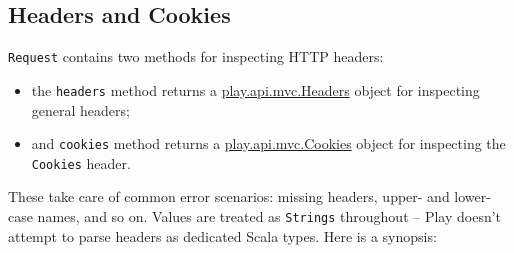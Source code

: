 \documentclass[oneside,11pt,a4paper,]{book}
\newenvironment{Shaded}{\begin{snugshade}}{\end{snugshade}}
\newcommand{\KeywordTok}[1]{\textcolor[rgb]{0.13,0.29,0.53}{\textbf{{#1}}}}
\newcommand{\CharTok}[1]{\textcolor[rgb]{0.31,0.60,0.02}{{#1}}}
\newcommand{\StringTok}[1]{\textcolor[rgb]{0.31,0.60,0.02}{{#1}}}
\newcommand{\FunctionTok}[1]{\textcolor[rgb]{0.00,0.00,0.00}{{#1}}}
\newcommand{\NormalTok}[1]{{#1}}
\begin{document}
\subsection{Headers and Cookies}\label{headers-and-cookies}

\texttt{Request} contains two methods for inspecting HTTP headers:

\begin{itemize}
\itemsep1pt\parskip0pt
\item
  the \texttt{headers} method returns a
  \href{https://www.playframework.com/documentation/2.3.x/api/scala/index.html\#play.api.mvc.Headers}{play.api.mvc.Headers}
  object for inspecting general headers;
\item
  and \texttt{cookies} method returns a
  \href{https://www.playframework.com/documentation/2.3.x/api/scala/index.html\#play.api.mvc.Cookies}{play.api.mvc.Cookies}
  object for inspecting the \texttt{Cookies} header.
\end{itemize}

These take care of common error scenarios: missing headers, upper- and
lower-case names, and so on. Values are treated as \texttt{Strings}
throughout -- Play doesn't attempt to parse headers as dedicated Scala
types. Here is a synopsis:

\begin{Shaded}
\end{Shaded}
\end{document}
